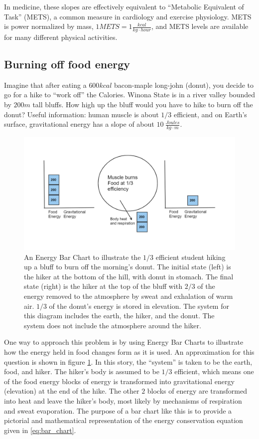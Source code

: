 \documentclass[jou]{apa7}
\begin{document}
In medicine, these slopes are effectively equivalent to ``Metabolic Equivalent of Task'' (METS), a common measure in cardiology and exercise physiology.  METS is power normalized by mass, $1METS=1\frac{kcal}{kg\cdot hour}$, and METS levels are available for many different physical activities.\cite{METS}

\subsection{Burning off food energy}
Imagine that after eating a $600kcal$ bacon-maple long-john (donut), you decide to go for a hike to ``work off'' the Calories.  
Winona State  is in a river valley bounded by $200m$ tall bluffs.  How high up the bluff would you have to hike to burn off the donut?  
Useful information: human muscle is about $1/3$ efficient, and on Earth's surface, gravitational energy has a slope of about $10~\frac{Joules}{kg\cdot m}$.

\begin{figure}[h]
\centering
\includegraphics[width=\columnwidth]{bar_chart.png}
\caption{An Energy Bar Chart to illustrate the $1/3$ efficient student hiking up a bluff to burn off the morning's donut.  The initial state (left) is the hiker at the bottom of the hill, with donut in stomach.  The final state (right) is the hiker at the top of the bluff with $2/3$ of the energy removed to the atmosphere by sweat and exhalation of warm air. $1/3$ of the donut's energy is stored in elevation.  The system for this diagram includes the earth, the hiker, and the donut.  The system does not include the atmosphere around the hiker.  
}
\label{bar_chart}
\end{figure}

One way to approach this problem is by using Energy Bar Charts\cite{energy_bar_charts} to illustrate how the energy held in food changes form as it is used.  An approximation for this question is shown in figure \ref{bar_chart}.  
In this story, the ``system'' is taken to be the earth, food, and hiker.  The hiker's body is assumed to be $1/3$ efficient, which means one of the food energy blocks of energy is transformed into gravitational energy (elevation) at the end of the hike.  
The other $2$ blocks of energy are transformed into heat and leave the hiker's body, most likely by mechanisms of respiration and sweat evaporation. The purpose of a bar chart like this is to provide a pictorial and mathematical representation of the energy conservation equation given in \ref{eq:bar_chart}.         
\end{document}
